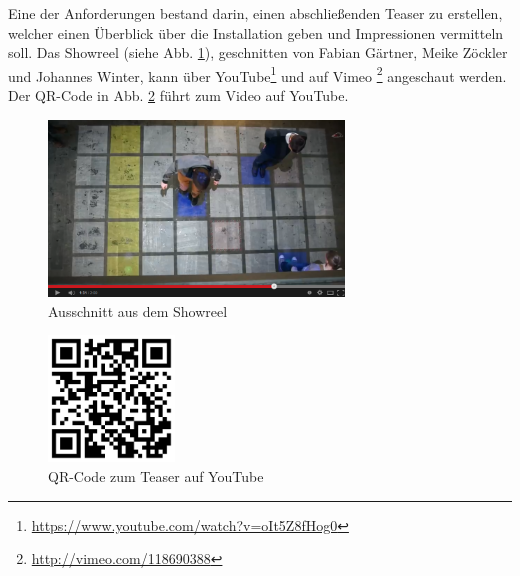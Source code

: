 
Eine der Anforderungen bestand darin, einen abschließenden Teaser zu erstellen, welcher einen Überblick über die Installation geben und Impressionen vermitteln soll. Das Showreel (siehe Abb. \ref{fig:showreel}), geschnitten von Fabian Gärtner, Meike Zöckler und Johannes Winter, kann über YouTube\footnote{\url{https://www.youtube.com/watch?v=oIt5Z8fHog0}} und auf Vimeo \footnote{\url{http://vimeo.com/118690388}} angeschaut werden. Der QR-Code in Abb. \ref{fig:qrcode} führt zum Video auf YouTube.

\begin{figure}[htbp]
	\centering
		\includegraphics[width=0.7\textwidth]{images/showreel.png}
	\caption{Ausschnitt aus dem Showreel}
	\label{fig:showreel}
\end{figure}

\begin{figure}[htbp]
	\centering
		\includegraphics[width=0.3\textwidth]{images/qrcode.png}
	\caption{QR-Code zum Teaser auf YouTube}
	\label{fig:qrcode}
\end{figure}

